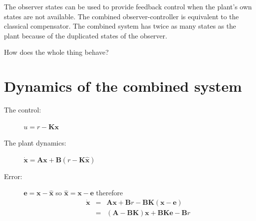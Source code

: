 \def\FileDate{10/04/02}
\def\FileVersion{1.0}

The observer states can be used to provide feedback control when the plant’s own states are not available. The combined observer-controller is equivalent to the classical compensator. The combined system has twice as many states as the plant because of the duplicated states of the observer. 

How does the whole thing behave?

\section*{Dynamics of the combined system} %
\label{sub:dynamics_of_the_combined_system}


 
\begin{description}
	\item[The control:] $u=r-\mathbf{K}\hat{\mathbf{x}}$
	\item[The plant dynamics:] $\dot{\mathbf{x}}=\mathbf{A}\mathbf{x}+\mathbf{B}(r-\mathbf{K}\hat{\mathbf{x}})$
	\item[Error:] $\mathbf{e}=\mathbf{x}-\hat{\mathbf{x}}$ so $\hat{\mathbf{x}}=\mathbf{x}-\mathbf{e}$ therefore
	\begin{eqnarray*}
			\dot{\mathbf{x}} & = & \mathbf{A}\mathbf{x}+\mathbf{B}r-\mathbf{BK}(\mathbf{x}-\mathbf{e}) \\
			                 & = & (\mathbf{A}-\mathbf{BK})\mathbf{x}+\mathbf{BK}\mathbf{e}-\mathbf{B}r
	\end{eqnarray*}
\end{description}

